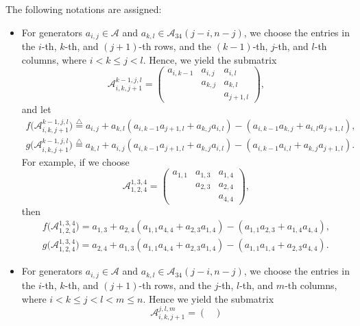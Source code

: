 \documentclass[10pt,a4paper]{amsart}
\numberwithin{equation}{section}
\def\lrb#1{\left(#1\right)}
\def\A{\mathscr{A}}
\begin{document}
The following notations are assigned:
\begin{itemize}\itemsep=0pt
\item For generators $a_{i, j} \in \A$ and $a_{k, l} \in \A_{34}(j-i, n-j)$, we choose the entries in the $i$-th, $k$-th, and $(j+1)$-th rows, and the $(k-1)$-th, $j$-th, and $l$-th columns, where $i < k \leq j < l$.
 Hence, we yield the submatrix
\begin{equation}\label{eqn-A-1}
\A_{i,k,j+1}^{k-1,j,l}=
\begin{pmatrix}
 a_{i,k-1}& a_{i,j} & a_{i,l}\\
 & a_{k,j} & a_{k, l}\\
 & & a_{j+1,l}
 \end{pmatrix}
,
\end{equation}
and let
\begin{gather}
f\bigl(\A_{i,k,j+1}^{k-1,j,l}\bigr)\overset{\bigtriangleup}{=} a_{i, j}+ a_{k, l} \lrb{a_{i, k-1}a_{j+1, l} + a_{k, j }a_{i, l}}-\lrb{a_{i, k-1}a_{k, j}+a_{i, l}a_{j+1, l}}, \label{eqn:natural}\\
g\bigl(\A_{i,k,j+1}^{k-1,j,l}\bigr)\overset{\bigtriangleup}{=} a_{k, l}+ a_{i, j}\lrb{a_{i, k-1}a_{j+1, l} + a_{k, j }a_{i, l}}-\lrb{a_{i, k-1}a_{i, l}+a_{k, j}a_{j+1, l}}. \label{eqn:sharp}
\end{gather}
For example, if we choose
\begin{equation*}
\A_{1,2,4}^{1,3,4}=
 \begin{pmatrix}
 a_{1,1}&a_{1,3} & a_{1,4}\\
 & a_{2,3} & a_{2, 4}\\
 & & a_{4,4}
 \end{pmatrix}
,
\end{equation*}
then
\begin{gather*}
f\bigl(\A_{1,2,4}^{1,3,4}\bigr)= a_{1, 3}+ a_{2, 4} \lrb{a_{1, 1}a_{4, 4} + a_{2, 3 }a_{1, 4}}-\lrb{a_{1, 1}a_{2, 3}+a_{1, 4}a_{4, 4}}, \\
g\bigl(\A_{1,2,4}^{1,3,4}\bigr)= a_{2, 4}+ a_{1, 3}\lrb{a_{1, 1}a_{4, 4} + a_{2, 3 }a_{1, 4}}-\lrb{a_{1, 1}a_{1, 4}+a_{2, 3}a_{4, 4}}.
\end{gather*}
 \item For generators $a_{i, j} \in \A$ and $a_{k, l} \in \A_{34}(j-i, n-j)$, we choose the entries in the $i$-th, $k$-th, and $(j+1)$-th rows, and the $j$-th, $l$-th, and $m$-th columns, where $i<k\leq j<l<m\leq n$.
 Hence we yield the submatrix
\begin{equation}\label{eqn-A-2}
\A_{i,k,j+1}^{j,l,m}=
 \begin{pmatrix}

\end{pmatrix}
\end{equation}
\end{itemize}
\end{document}
